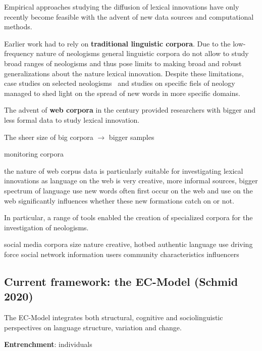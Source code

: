 \documentclass[a4paper]{scrartcl}
\renewcommand{\hw}[1]{\textbf{#1}}
\begin{document}
    Empirical approaches studying the diffusion of lexical innovations have only recently become feasible with the advent of new data sources and computational methods.

    Earlier work had to rely on \hw{traditional linguistic corpora}. Due to the low-frequency nature of neologisms general linguistic corpora do not allow to study broad ranges of neologisms and thus pose limits to making broad and robust generalizations about the nature lexical innovation. Despite these limitations, case studies on selected neologisms~\parencite{Hohenhaus2006} and studies on specific fiels of neology~\parencite{Elsen2004} managed to shed light on the spread of new words in more specific domains.

    The advent of \hw{web corpora} in the  century provided researchers with bigger and less formal data to study lexical innovation.

      The sheer size of big corpora $\rightarrow$ bigger samples

      monitoring corpora~\parencite{Davies2013}

      the nature of web corpus data is particularly suitable for investigating lexical innovations as
        language on the web is very creative,
        more informal sources, bigger spectrum of language use
        new words often first occur on the web
        and use on the web significantly influences whether these new formations catch on or not.

      In particular, a range of tools enabled the creation of specialized corpora for the investigation of neologisms.~\parencite{Renouf2006,Kerremans2012,Lemnitzer,Gerard2017,Cartier2017}

    social media corpora \cite{Grieve2016,Eisenstein2014}
      size
      nature
        creative, hotbed
        authentic language use
        driving force
      social network information
        users
        community characteristics
        influencers

  \subsection{Current framework: the EC-Model (Schmid 2020)}
    \nocite{Schmid2020}

    The EC-Model integrates both structural, cognitive and sociolinguistic perspectives on language structure, variation and change.

    \hw{Entrenchment}: individuals
\end{document}
